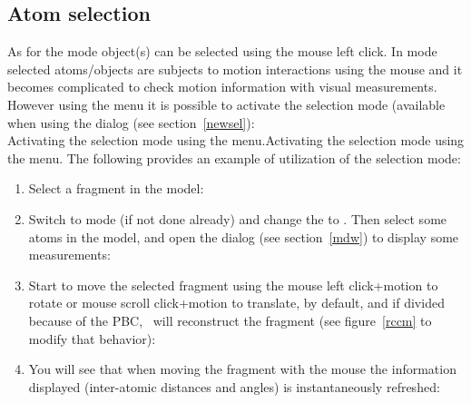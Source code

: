 \subsection{Atom selection}
\label{asel}
As for the  mode object(s) can be selected using the mouse left click. 
In  mode selected atoms/objects are subjects to motion interactions using the mouse and it becomes complicated 
to check motion information with visual measurements. However using the  menu it is possible to activate the  selection mode (available when using 
the  dialog (see section~\ref{newsel}): \\
{Activating the  selection mode using the  menu.}{Activating the  selection mode using the  menu.}
\laf The following provides an example of utilization of the  selection mode:
\begin{enumerate}
\item Select a fragment in the model: 
\begin{center}\end{center}
\newpage
\item Switch to  mode (if not done already) and change the  to .
Then select some atoms in the model, and open the  dialog (see section~\ref{mdw}) to display some measurements:
\begin{center}\end{center}
\item Start to move the selected fragment using the mouse left click+motion to rotate or mouse scroll click+motion to translate, 
by default, and if divided because of the PBC, \atomes\ will reconstruct the fragment (see figure~\ref{rccm} to modify that behavior): 
\begin{center}\end{center}
\item You will see that when moving the fragment with the mouse the information displayed (inter-atomic distances and angles) 
is instantaneously refreshed:
\begin{center}\end{center}
\end{enumerate}

